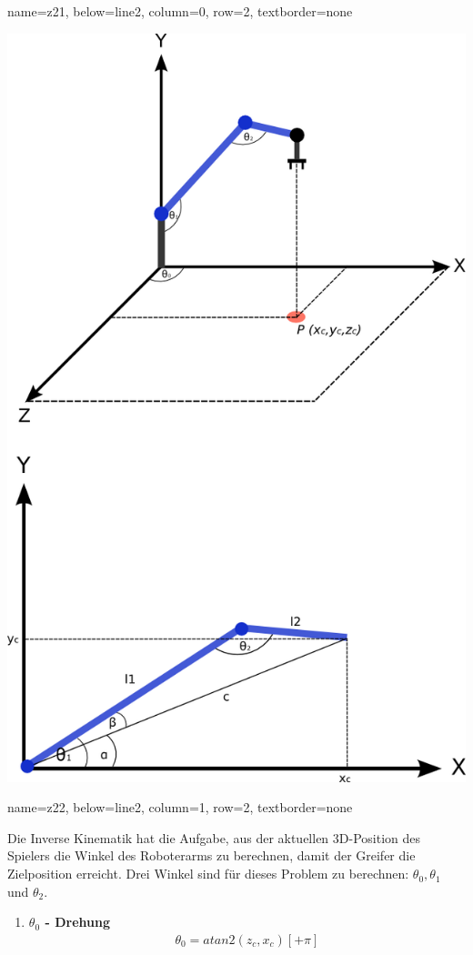 \documentclass[portrait,a0paper]{baposter}
\begin{document}
\begin{poster}
    {
    name=z21,
    below=line2,
    column=0,
    row=2,
    textborder=none
    }
    {
        \includegraphics[width=\textwidth]{imgs/inverseKinematik.png}

 }
\headerbox{}
    {
    name=z22,
    below=line2,
    column=1,
    row=2,
    textborder=none
    }
    {
	Die Inverse Kinematik hat die Aufgabe, aus der aktuellen 3D-Position des Spielers die Winkel des Roboterarms zu berechnen, damit der Greifer die Zielposition erreicht. Drei Winkel sind für dieses Problem zu berechnen: $\theta_0, \theta_1$ und $\theta_2$.
	\begin{enumerate}
	\item \textbf{$\theta_0$ - Drehung} 
\begin{eqnarray*}
	\theta_0 = atan2(z_c, x_c) \left[+ \pi \right]
	\end{eqnarray*}
	

\end{enumerate}}
\end{poster}
\end{document}
